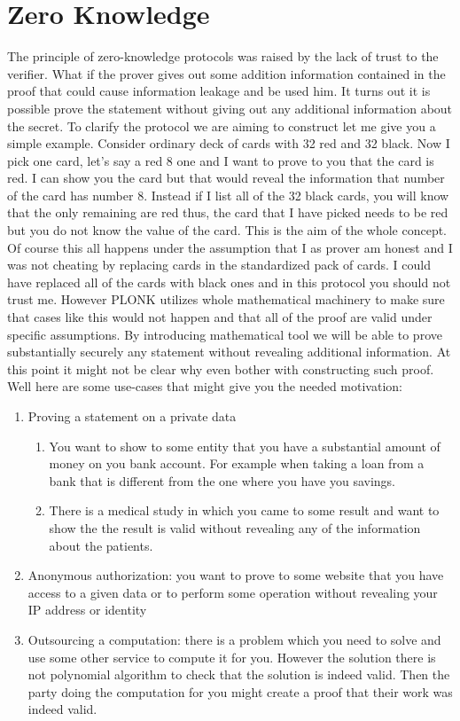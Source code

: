 \section{Zero Knowledge}
The principle of zero-knowledge protocols was raised by the lack of trust to the verifier. What if the prover gives out some addition information contained in the proof that could cause information leakage and be used him. It turns out it is possible prove the statement without giving out any additional information about the secret.  To clarify the protocol we are aiming to construct let me give you a simple example. Consider ordinary deck of cards with 32 red and 32 black. Now I pick one card, let's say a red 8 one and I want to prove to you that the card is red. I can show you the card but that would reveal the information that number of the card has number 8. Instead if I list all of the 32 black cards, you will know that the only remaining are red thus, the card that I have picked needs to be red but you do not know the value of the card. This is the aim of the whole concept. Of course this all happens under the assumption that I as prover am honest and I was not cheating by replacing cards in the standardized pack of cards.  I could have replaced all of the cards with black ones and in this protocol you should not trust me. However PLONK utilizes whole mathematical machinery to make sure that cases like this would not happen and that all of the proof are valid under specific assumptions. By introducing mathematical tool we will be able to prove substantially securely any statement without revealing additional information. At this point it might not be clear why even bother with constructing such proof. Well here are some use-cases that might give you the needed motivation:

\begin{enumerate}
    \item Proving a statement on a private data
    \begin{enumerate}
        \item You want to show to some entity that you have a substantial amount of money on you bank account. For example when taking a loan from a bank that is different from the one where you have you savings.
        \item There is a medical study in which you came to some result and want to show the the result is valid without revealing any of the information about the patients.
    \end{enumerate}
    \item Anonymous authorization:  you want to prove to some website that you have access to a given data or to perform some operation without revealing your IP address or identity
    \item Outsourcing a computation: there is a problem which you need to solve and use some other service to compute it for you. However the solution there is not polynomial algorithm to check that the solution is indeed valid. Then the party doing the computation for you might create a proof that their work was indeed valid.  
\end{enumerate}


